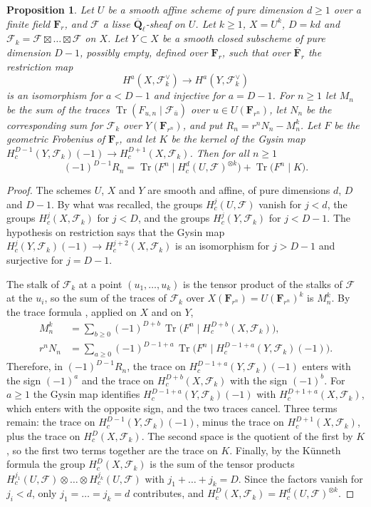 \documentclass[11pt,a4paper]{article}
\theoremstyle{plain}
\newtheorem{proposition}[theorem]{Proposition}
\theoremstyle{remark}
\newcommand{\Ql}{\overline{\mathbf Q}_\ell}
\newcommand{\F}{\mathcal F}
\newcommand{\Tr}{\operatorname{Tr}}
\begin{document}
\begin{proposition}\label{prop:remainder}
Let $U$ be a smooth affine scheme of pure dimension $d\ge1$ over a finite field $\mathbf F_r$, and $\F$ a lisse
$\Ql$-sheaf on $U$. Let $k\ge1$, $X=U^k$, $D=kd$ and $\F_k=\F\boxtimes\dots\boxtimes\F$ on $X$. Let $Y\subset X$ be a
smooth closed subscheme of pure dimension $D-1$, possibly empty, defined over $\mathbf F_r$, such that over
$\overline{\mathbf F}_r$ the restriction map
\[
H^a(X,\F_k^\vee)\longrightarrow H^a(Y,\F_k^\vee)
\]
is an isomorphism for $a<D-1$ and injective for $a=D-1$. For $n\ge1$ let $M_n$ be the sum of the traces
$\Tr(F_{u,n}\mid\F_{\bar u})$ over $u\in U(\mathbf F_{r^n})$, let $N_n$ be the corresponding sum for $\F_k$ over
$Y(\mathbf F_{r^n})$, and put $R_n=r^nN_n-M_n^k$. Let $F$ be the geometric Frobenius of $\mathbf F_r$, and let $K$ be
the kernel of the Gysin map $H^{D-1}_c(Y,\F_k)(-1)\to H^{D+1}_c(X,\F_k)$. Then for all $n\ge1$
\[
(-1)^{D-1}R_n=\Tr\bigl(F^n\mid H^d_c(U,\F)^{\otimes k}\bigr)+\Tr\bigl(F^n\mid K\bigr).
\]
\end{proposition}

\begin{proof}
The schemes $U$, $X$ and $Y$ are smooth and affine, of pure dimensions $d$, $D$ and $D-1$. By what was recalled, the
groups $H^j_c(U,\F)$ vanish for $j<d$, the groups $H^j_c(X,\F_k)$ for $j<D$, and the groups $H^j_c(Y,\F_k)$ for
$j<D-1$. The hypothesis on restriction says that the Gysin map $H^j_c(Y,\F_k)(-1)\to H^{j+2}_c(X,\F_k)$ is an
isomorphism for $j>D-1$ and surjective for $j=D-1$.

The stalk of $\F_k$ at a point $(u_1,\dots,u_k)$ is the tensor product of the stalks of $\F$ at the $u_i$, so the
sum of the traces of $\F_k$ over $X(\mathbf F_{r^n})=U(\mathbf F_{r^n})^k$ is $M_n^k$. By the trace formula
\cite[Rapport, Th\'eor\`eme 3.2]{SGA4h}, applied on $X$ and on $Y$,
\begin{align*}
M_n^k&=\sum_{b\ge0}(-1)^{D+b}\,\Tr\bigl(F^n\mid H^{D+b}_c(X,\F_k)\bigr),\\
r^nN_n&=\sum_{a\ge0}(-1)^{D-1+a}\,\Tr\bigl(F^n\mid H^{D-1+a}_c(Y,\F_k)(-1)\bigr).
\end{align*}
Therefore, in $(-1)^{D-1}R_n$, the trace on $H^{D-1+a}_c(Y,\F_k)(-1)$ enters with the sign $(-1)^a$ and the
trace on $H^{D+b}_c(X,\F_k)$ with the sign $(-1)^b$. For $a\ge1$ the Gysin map identifies $H^{D-1+a}_c(Y,\F_k)(-1)$ with
$H^{D+1+a}_c(X,\F_k)$, which enters with the opposite sign, and the two traces cancel. Three terms remain: the trace
on $H^{D-1}_c(Y,\F_k)(-1)$, minus the trace on $H^{D+1}_c(X,\F_k)$, plus the trace on $H^D_c(X,\F_k)$. The second
space is the quotient of the first by $K$, so the first two terms together are the trace on $K$. Finally, by the
K\"unneth formula \cite[XVII, 5.4.3]{SGA4} the group $H^D_c(X,\F_k)$ is the sum of the tensor products
$H^{j_1}_c(U,\F)\otimes\dots\otimes H^{j_k}_c(U,\F)$ with $j_1+\dots+j_k=D$. Since the factors vanish for $j_i<d$,
only $j_1=\dots=j_k=d$ contributes, and $H^D_c(X,\F_k)=H^d_c(U,\F)^{\otimes k}$.
\end{proof}
\end{document}
